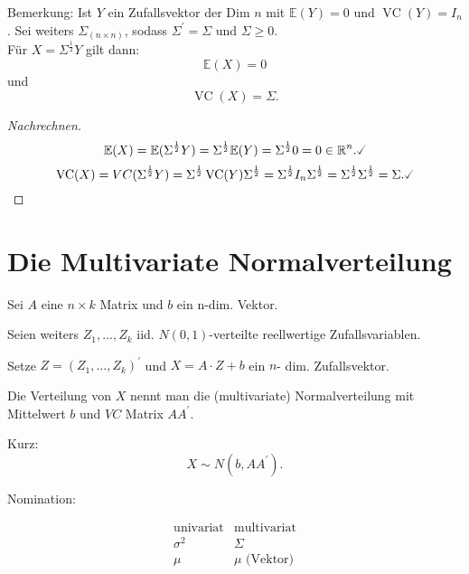 \documentclass{tstextbook}
\DeclareMathOperator{\VC}{VC} %
\newcommand{\E}{\mathbb E}
\newcommand{\R}{\mathbb R}
\begin{document}
	\begin{remark}
		Bemerkung: Ist $ Y $ ein Zufallsvektor der Dim $ n $ mit $ \E(Y) = 0 $ und $ \VC(Y) = I_n $. Sei weiters $ \Sigma_{(n \times n)} $, sodass $ \Sigma^\prime = \Sigma $ und $ \Sigma \ge 0 $. \\
		Für $ X = \Sigma^{\frac{1}{2}} Y $ gilt dann: \[ \E(X) = 0 \] und \[ \VC(X) = \Sigma. \]
	\end{remark}
	
	\begin{proof}[Nachrechnen]
		\[
		\E(X) = \E(\Sigma^{\frac{1}{2}} Y) = \Sigma^{\frac{1}{2}} \E(Y) = \Sigma^{\frac{1}{2}} 0 = 0 \in \R^n. \checked
		\]
		\[ \VC(X) = VC(\Sigma^{\frac{1}{2}} Y) = \Sigma^{\frac{1}{2}} \VC(Y) \Sigma^{\frac{1}{2}} = \Sigma^{\frac{1}{2}} I_n \Sigma^{\frac{1}{2}} = \Sigma^{\frac{1}{2}} \Sigma^{\frac{1}{2}} = \Sigma. \checked \]
	\end{proof}
	
\section{Die Multivariate Normalverteilung}


\begin{definition}
	
	Sei $A$ eine $n\times k$ Matrix und $b$ ein n-dim. Vektor. 
	
	Seien weiters $Z_{1},\ldots,Z_{k}$ iid. $N(0,1)$-verteilte reellwertige Zufallsvariablen. 
	
	Setze $Z=\left(Z_{1},\ldots,Z_{k}\right)^{\prime}$ und $X=A\cdot Z+b$
	ein $n$- dim. Zufallsvektor.
	
	Die Verteilung von $X$ nennt man die (multivariate) Normalverteilung
	mit Mittelwert $b$ und $VC$ Matrix $AA^{\prime}.$
	
	Kurz: 
	\[
	X\sim N(b,AA^{\prime}).
	\]
	
	Nomination:
	
	\[
	\begin{array}{cc}
		\text{univariat} & \text{multivariat}\\
		\sigma^{2} & \Sigma\\
		\mu & \mu\text{ (Vektor)}
	\end{array}
	\]
	\end{definition}
\end{document}
